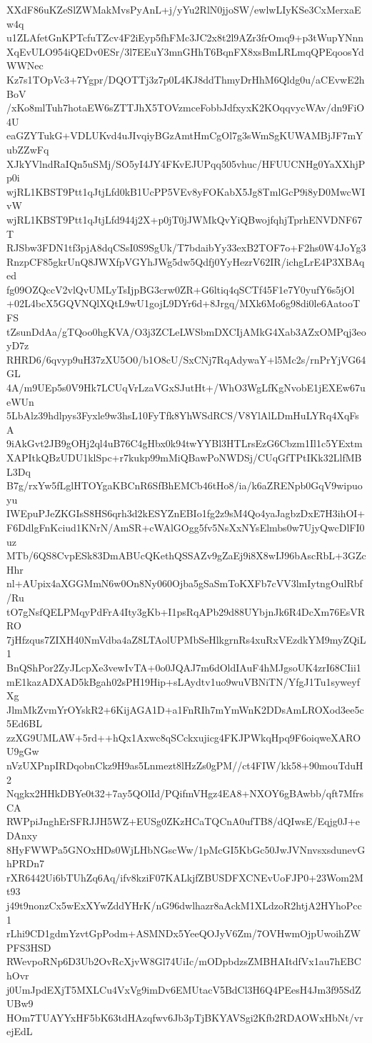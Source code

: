 XXdF86uKZeSlZWMakMvsPyAnL+j/yYu2RlN0jjoSW/ewlwLIyKSe3CxMerxaEw4q
u1ZLAfetGnKPTcfuTZcv4F2iEyp5fhFMc3JC2x8t2l9AZr3frOmq9+p3tWupYNnn
XqEvULO954iQEDv0ESr/3l7EEuY3mnGHhT6BqnFX8xsBmLRLmqQPEqoosYdWWNec
Kz7s1TOpVc3+7Ygpr/DQOTTj3z7p0L4KJ8ddThmyDrHhM6Qldg0u/aCEvwE2hBoV
/xKo8mlTuh7hotaEW6sZTTJhX5TOVzmceFobbJdfxyxK2KOqqvycWAv/dn9FiO4U
eaGZYTukG+VDLUKvd4uJIvqiyBGzAmtHmCgOl7g3sWmSgKUWAMBjJF7mYubZZwFq
XJkYVlndRaIQn5uSMj/SO5yI4JY4FKvEJUPqq505vhuc/HFUUCNHg0YaXXhjPp0i
wjRL1KBST9Ptt1qJtjLfd0kB1UcPP5VEv8yFOKabX5Jg8TmlGcP9i8yD0MwcWIvW
wjRL1KBST9Ptt1qJtjLfd944j2X+p0jT0jJWMkQvYiQBwojfqhjTprhENVDNF67T
RJSbw3FDN1tf3pjA8dqCSsI0S9SgUk/T7bdaibYy33exB2TOF7o+F2hs0W4JoYg3
RnzpCF85gkrUnQ8JWXfpVGYhJWg5dw5Qdfj0YyHezrV62IR/ichgLrE4P3XBAqed
fg09OZQccV2vlQvUMLyTsIjpBG3crw0ZR+G6ltiq4qSCTf45F1e7Y0yufY6s5jOl
+02L4bcX5GQVNQlXQtL9wU1gojL9DYr6d+8Jrgq/MXk6Mo6g98di0le6AatooTFS
tZsunDdAa/gTQoo0hgKVA/O3j3ZCLeLWSbmDXCIjAMkG4Xab3AZxOMPqj3eoyD7z
RHRD6/6qvyp9uH37zXU5O0/b1O8cU/SxCNj7RqAdywaY+l5Mc2s/rnPrYjVG64GL
4A/m9UEp5s0V9Hk7LCUqVrLzaVGxSJutHt+/WhO3WgLfKgNvobE1jEXEw67ueWUn
5LbAlz39hdlpys3Fyxle9w3hsL10FyTfk8YhWSdRCS/V8YlAlLDmHuLYRq4XqFsA
9iAkGvt2JB9gOHj2ql4uB76C4gHbx0k94twYYBl3HTLrsEzG6Cbzm1Il1c5YExtm
XAPItkQBzUDU1klSpc+r7kukp99mMiQBawPoNWDSj/CUqGfTPtIKk32LlfMBL3Dq
B7g/rxYw5fLglHTOYgaKBCnR6SfBhEMCb46tHo8/ia/k6aZRENpb0GqV9wipuoyu
IWEpuPJeZKGIsS8HS6qrh3d2kESYZnEBIo1fg2z9sM4Qo4yaJagbzDxE7H3ihOI+
F6DdlgFnKciud1KNrN/AmSR+cWAlGOgg5fv5NsXxNYsElmbs0w7UjyQwcDlFI0uz
MTb/6QS8CvpESk83DmABUcQKethQSSAZv9gZaEj9i8X8wIJ96bAscRbL+3GZcHhr
nl+AUpix4aXGGMmN6w0On8Ny060Ojba5gSaSmToKXFb7cVV3lmIytngOulRbf/Ru
tO7gNsfQELPMqyPdFrA4Ity3gKb+I1psRqAPb29d88UYbjnJk6R4DcXm76EsVRRO
7jHfzqus7ZIXH40NmVdba4aZ8LTAolUPMbSeHlkgrnRs4xuRxVEzdkYM9myZQiL1
BnQShPor2ZyJLcpXe3vewIvTA+0o0JQAJ7m6dOldIAuF4hMJgsoUK4zrI68CIii1
mE1kazADXAD5kBgah02sPH19Hip+sLAydtv1uo9wuVBNiTN/YfgJ1Tu1syweyfXg
JlmMkZvmYrOYskR2+6KijAGA1D+a1FnRIh7mYmWnK2DDsAmLROXod3ee5c5Ed6BL
zzXG9UMLAW+5rd++hQx1Axwc8qSCckxujicg4FKJPWkqHpq9F6oiqweXAROU9gGw
nVzUXPnpIRDqobnCkz9H9as5Lnmezt8lHzZs0gPM//ct4FIW/kk58+90mouTduH2
Nqgkx2HHkDBYe0t32+7ay5QOlId/PQifmVHgz4EA8+NXOY6gBAwbb/qft7MfrsCA
RWPpiJnghErSFRJJH5WZ+EUSg0ZKzHCaTQCnA0ufTB8/dQIwsE/Eqjg0J+eDAnxy
8HyFWWPa5GNOxHDs0WjLHbNGscWw/1pMcGI5KbGc50JwJVNnvsxsdunevGhPRDn7
rXR6442Ui6bTUhZq6Aq/ifv8kziF07KALkjfZBUSDFXCNEvUoFJP0+23Wom2Mt93
j49t9nonzCx5wExXYwZddYHrK/nG96dwlhazr8aAckM1XLdzoR2htjA2HYhoPcc1
rLhi9CD1gdmYzvtGpPodm+ASMNDx5YeeQOJyV6Zm/7OVHwmOjpUwoihZWPFS3HSD
RWevpoRNp6D3Ub2OvRcXjvW8Gl74UiIc/mODpbdzsZMBHAItdfVx1au7hEBChOvr
j0UmJpdEXjT5MXLCu4VxVg9imDv6EMUtacV5BdCl3H6Q4PEesH4Jm3f95SdZUBw9
HOm7TUAYYxHF5bK63tdHAzqfwv6Jb3pTjBKYAVSgi2Kfb2RDAOWxHbNt/vrejEdL
